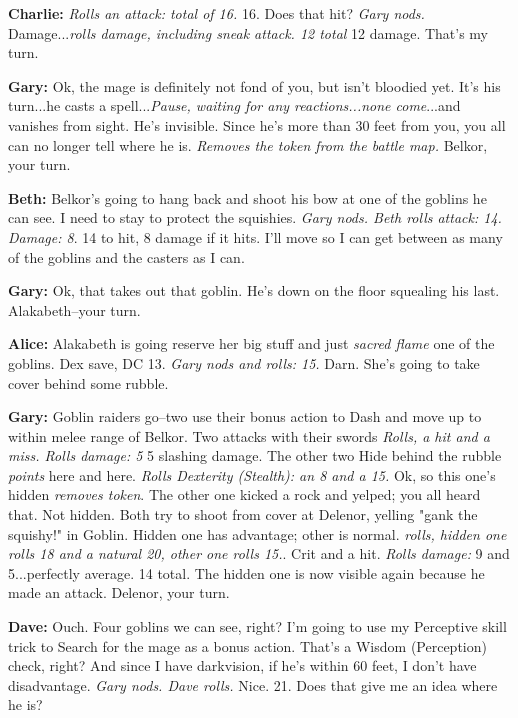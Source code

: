 \textbf{Charlie:} \textit{Rolls an attack: total of 16.} 16. Does that hit? \textit{Gary nods.} Damage...\textit{rolls damage, including sneak attack. 12 total} 12 damage. That's my turn.

\textbf{Gary:} Ok, the mage is definitely not fond of you, but isn't bloodied yet. It's his turn...he casts a spell...\textit{Pause, waiting for any reactions...none come}...and vanishes from sight. He's invisible. Since he's more than 30 feet from you, you all can no longer tell where he is. \textit{Removes the token from the battle map.} Belkor, your turn.

\textbf{Beth:} Belkor's going to hang back and shoot his bow at one of the goblins he can see. I need to stay to protect the squishies. \textit{Gary nods. Beth rolls attack: 14. Damage: 8}. 14 to hit, 8 damage if it hits. I'll move so I can get between as many of the goblins and the casters as I can.

\textbf{Gary:} Ok, that takes out that goblin. He's down on the floor squealing his last. Alakabeth--your turn.

\textbf{Alice:} Alakabeth is going reserve her big stuff and just \textit{sacred flame} one of the goblins. Dex save, DC 13. \textit{Gary nods and rolls: 15.} Darn. She's going to take cover behind some rubble.

\textbf{Gary:} Goblin raiders go--two use their bonus action to Dash and move up to within melee range of Belkor. Two attacks with their swords \textit{Rolls, a hit and a miss. Rolls damage: 5} 5 slashing damage. The other two Hide behind the rubble \textit{points} here and here. \textit{Rolls Dexterity (Stealth): an 8 and a 15.} Ok, so this one's hidden \textit{removes token}. The other one kicked a rock and yelped; you all heard that. Not hidden. Both try to shoot from cover at Delenor, yelling "gank the squishy!" in Goblin. Hidden one has advantage; other is normal. \textit{rolls, hidden one rolls 18 and a natural 20, other one rolls 15.}. Crit and a hit. \textit{Rolls damage:} 9 and 5...perfectly average. 14 total. The hidden one is now visible again because he made an attack. Delenor, your turn.

\textbf{Dave:} Ouch. Four goblins we can see, right? I'm going to use my Perceptive skill trick to Search for the mage as a bonus action. That's a Wisdom (Perception) check, right? And since I have darkvision, if he's within 60 feet, I don't have disadvantage. \textit{Gary nods. Dave rolls.} Nice. 21. Does that give me an idea where he is?

